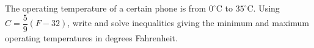 The operating temperature of a certain phone is from $0^\circ$C to $35^\circ$C. Using $C=\dfrac{5}{9}(F-32)$, write and solve inequalities giving the minimum and maximum operating temperatures in degrees Fahrenheit.
